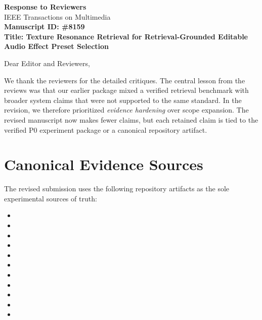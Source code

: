 \documentclass[11pt,a4paper]{article}
\begin{document}
\begin{center}
    {\Large\bfseries Response to Reviewers}\\[0.5em]
    {\large IEEE Transactions on Multimedia}\\[1em]
    {\bfseries Manuscript ID: \#8159}\\[0.3em]
    {\bfseries Title: Texture Resonance Retrieval for Retrieval-Grounded Editable Audio Effect Preset Selection}\\[1.2em]
\end{center}

\noindent Dear Editor and Reviewers,

\medskip

We thank the reviewers for the detailed critiques. The central lesson from the reviews was that our earlier package mixed a verified retrieval benchmark with broader system claims that were not supported to the same standard. In the revision, we therefore prioritized \emph{evidence hardening} over scope expansion. The revised manuscript now makes fewer claims, but each retained claim is tied to the verified P0 experiment package or a canonical repository artifact.

\section*{Canonical Evidence Sources}

The revised submission uses the following repository artifacts as the sole experimental sources of truth:

{\footnotesize
\begin{itemize}[leftmargin=2em]
    \item {}
    \item {}
    \item {}
    \item {}
    \item {}
    \item {}
    \item {}
    \item {}
    \item {}
    \item {}
    \item {}
\end{itemize}
}
\end{document}

